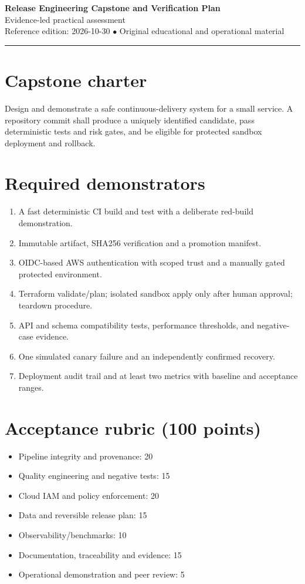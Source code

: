 \documentclass[10pt,letterpaper]{article}
\begin{document}
\begin{center}
{\LARGE\bfseries\color{cdblue}Release Engineering Capstone and Verification Plan}\\[7pt]
{\large Evidence-led practical assessment}\\[6pt]
{\small Reference edition: 2026-10-30 $\bullet$ Original educational and operational material}
\end{center}
\noindent\color{cdblue}\rule{\linewidth}{1.2pt}\color{black}
\vspace{0.4em}
\section{Capstone charter}
Design and demonstrate a safe continuous-delivery system for a small service. A repository commit shall produce a uniquely identified candidate, pass deterministic tests and risk gates, and be eligible for protected sandbox deployment and rollback.


\section{Required demonstrators}
\begin{enumerate}
\item A fast deterministic CI build and test with a deliberate red-build demonstration.
\item Immutable artifact, SHA256 verification and a promotion manifest.
\item OIDC-based AWS authentication with scoped trust and a manually gated protected environment.
\item Terraform validate/plan; isolated sandbox apply only after human approval; teardown procedure.
\item API and schema compatibility tests, performance thresholds, and negative-case evidence.
\item One simulated canary failure and an independently confirmed recovery.
\item Deployment audit trail and at least two metrics with baseline and acceptance ranges.
\end{enumerate}

\section{Acceptance rubric (100 points)}
\begin{itemize}
\item Pipeline integrity and provenance: 20
\item Quality engineering and negative tests: 15
\item Cloud IAM and policy enforcement: 20
\item Data and reversible release plan: 15
\item Observability/benchmarks: 10
\item Documentation, traceability and evidence: 15
\item Operational demonstration and peer review: 5
\end{itemize}
\end{document}
